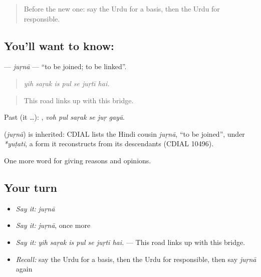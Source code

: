 \label{lesson:UR-C331-jurna}



\begin{quote}
Before the new one: say the Urdu for a basis, then the Urdu for responsible.
\end{quote}

\subsection*{You'll want to know: }
\textbf{} — \emph{juṛnā} — \textquotedblleft{}to be joined; to be linked\textquotedblright{}.

\begin{quote}
      
\end{quote}

\begin{quote}
\emph{yih saṛak is pul se juṛtī hai.}
\end{quote}

\begin{quote}
This road links up with this bridge.
\end{quote}

Past (it …):      , \emph{voh pul saṛak se juṛ gayā}.

\begin{cousinweb}
\textbf{} (\emph{juṛnā}) is inherited: CDIAL lists the Hindi cousin \emph{juṛnā}, \textquotedblleft{}to be joined\textquotedblright{}, under \emph{*yuṭati}, a form it reconstructs from its descendants (CDIAL 10496).
\end{cousinweb}

\begin{grammarlens}[title={What you've built}]
One more word for giving reasons and opinions.
\end{grammarlens}

\subsection*{Your turn}
\begin{itemize}
\raggedright
  \item \emph{Say it:} \emph{juṛnā}
  \item \emph{Say it:} \emph{juṛnā}, once more
  \item \emph{Say it:} \emph{yih saṛak is pul se juṛtī hai.} — This road links up with this bridge.
  \item \emph{Recall:} say the Urdu for a basis, then the Urdu for responsible, then say \emph{juṛnā} again
\end{itemize}

